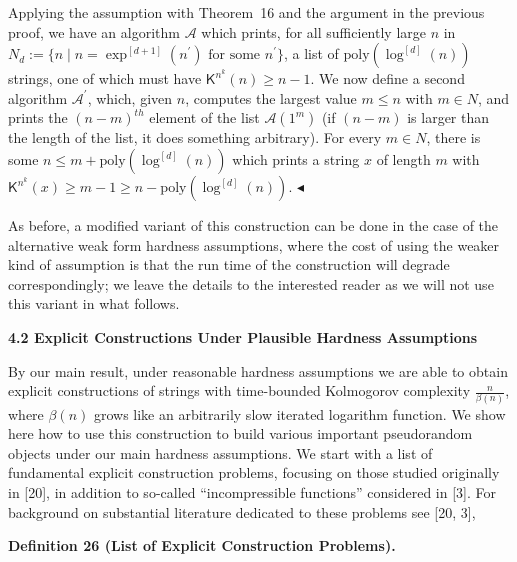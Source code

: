 Applying the assumption with Theorem 16 and the argument in the previous proof, we have an algorithm $\mathcal{A}$ which prints, for all sufficiently large $n$ in $N_{d}:=\{n\mid n=\exp^{[d+1]}(n^{\prime})\text{ for some }n^{\prime}\}$, a list of $\mathrm{poly}(\log^{[d]}(n))$ strings, one of which must have ${\mathsf{K}}^{n^{k}}(n)\geq n-1$. We now define a second algorithm $\mathcal{A}^{\prime}$, which, given $n$, computes the largest value $m\leq n$ with $m\in N$, and prints the $(n-m)^{th}$ element of the list $\mathcal{A}(1^{m})$ (if $(n-m)$ is larger than the length of the list, it does something arbitrary). For every $m\in N$, there is some $n\leq m+\mathrm{poly}(\log^{[d]}(n))$ which prints a string $x$ of length $m$ with ${\mathsf{K}}^{n^{k}}(x)\geq m-1\geq n-\mathrm{poly}(\log^{[d]}(n))$.
$\blacktriangleleft$\par




As before, a modified variant of this construction can be done in the case of the alternative weak form hardness assumptions, where the cost of using the weaker kind of assumption is that the run time of the construction will degrade correspondingly; we leave the details to the interested reader as we will not use this variant in what follows.\par






\par\medskip\noindent\textbf{
4.2 Explicit Constructions Under Plausible Hardness Assumptions}\par




By our main result, under reasonable hardness assumptions we are able to obtain explicit constructions of strings with time-bounded Kolmogorov complexity $\frac{n}{\beta(n)}$, where $\beta(n)$ grows like an arbitrarily slow iterated logarithm function. We show here how to use this construction to build various important pseudorandom objects under our main hardness assumptions. We start with a list of fundamental explicit construction problems, focusing on those studied originally in [20], in addition to so-called “incompressible functions” considered in [3]. For background on substantial literature dedicated to these problems see [20, 3],\par





\par\medskip\noindent\textbf{
\textbf{Definition 26}\textbf{ }(List of Explicit Construction Problems)\textbf{.}
}\par



